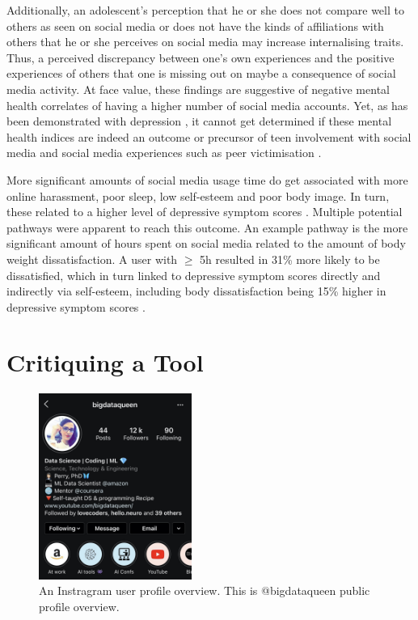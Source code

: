\documentclass{sigchi}
\begin{document}
	Additionally, an adolescent's perception that he or she does not compare well to others as seen on social media or does not have the kinds of affiliations with others that he or she perceives on social media may increase internalising traits. Thus, a perceived discrepancy between one's own experiences and the positive experiences of others that one is missing out on maybe a consequence of social media activity. At face value, these findings are suggestive of negative mental health correlates of having a higher number of social media accounts. Yet, as has been demonstrated with depression \cite{frison2016short}, it cannot get determined if these mental health indices are indeed an outcome or precursor of teen involvement with social media and social media experiences such as peer victimisation \cite{barry2017adolescent}.
	
	More significant amounts of social media usage time do get associated with more online harassment, poor sleep, low self-esteem and poor body image. In turn, these related to a higher level of depressive symptom scores \cite{kelly2018social}. Multiple potential pathways were apparent to reach this outcome. An example pathway is the more significant amount of hours spent on social media related to the amount of body weight dissatisfaction. A user with $\geq$ 5h resulted in 31\% more likely to be dissatisfied, which in turn linked to depressive symptom scores directly and indirectly via self-esteem, including body dissatisfaction being 15\% higher in depressive symptom scores \cite{kelly2018social}.

\section{Critiquing a Tool}


\begin{figure}
	\begin{center}
		\includegraphics[width=5cm]{instagram_example2.jpeg}
		\caption{An Instragram user profile overview. This is @bigdataqueen public profile overview.}
		\label{fig:instagram_overview}
	\end{center}
\end{figure}
\end{document}
